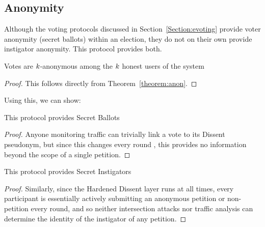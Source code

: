 \subsection{Anonymity}
Although the voting protocols discussed in Section~\ref{Section:evoting}
provide voter anonymity (secret ballots) within an election, they do not on
their own provide instigator anonymity. This protocol provides both.

\begin{lemma} Votes are $k$-anonymous among the $k$ honest
  users of the system \end{lemma}
\begin{proof} This follows directly from Theorem~\ref{theorem:anon}.\end{proof}

Using this, we can show:

\begin{theorem} This protocol provides Secret Ballots \end{theorem}
\begin{proof} Anyone monitoring traffic can trivially link a vote to its Dissent
  pseudonym, but since this changes every round \cite{sec}, this provides no
  information beyond the scope of a single petition.
\end{proof}

\begin{theorem} This protocol provides Secret Instigators \end{theorem}
\begin{proof} Similarly, since the Hardened Dissent layer runs at all times,
  every participant is essentially actively submitting an anonymous petition or
  non-petition every round, and so neither intersection attacks nor traffic
  analysis can determine the identity of the instigator of any petition.
\end{proof}

